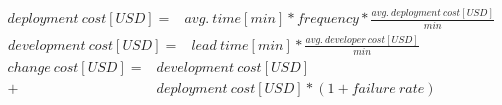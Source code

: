 \documentclass[../main.tex]{subfiles}
\begin{document}
    \begin{figure}[h]
        \begin{equation}
            \label{eq:deployment_cost}
            \begin{split}
                deployment\ cost[USD] =& avg.\ time[min] * frequency * \frac{avg.\ deployment\ cost[USD]}{min}
            \end{split}
        \end{equation}
        \begin{equation}
            \label{eq:development_cost}
            \begin{split}
                development\ cost[USD] =& lead\ time[min] * \frac{avg.\ developer\ cost[USD]}{min}
            \end{split}
        \end{equation}
        \begin{equation}
            \label{eq:change_cost}
            \begin{split}
                change\ cost[USD] =& development\ cost[USD] \\
                +& deployment\ cost[USD] * (1 + failure\ rate)
            \end{split}
        \end{equation}
    \end{figure}
\end{document}
